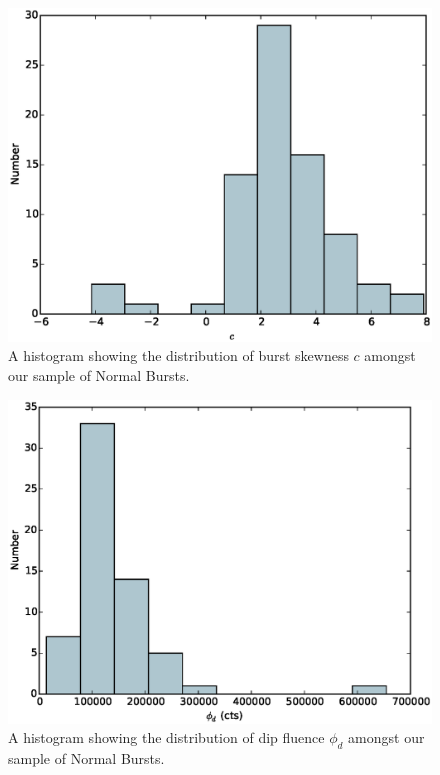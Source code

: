 \begin{figure}
  \centering
  \includegraphics[width=.9\linewidth, trim={0cm 0 0cm 0},clip]{images/appendix_burst_skew_hist.eps}
  \caption[Histogram showing the distribution of $c$ amongst Normal Bursts.]{A histogram showing the distribution of burst skewness $c$ amongst our sample of Normal Bursts. }
  \label{fig:app_hist_c}
\end{figure}

\begin{figure}
  \centering
  \includegraphics[width=.9\linewidth, trim={0cm 0 0cm 0},clip]{images/appendix_dip_aafluence_hist.eps}
  \caption[Histogram showing the distribution of $\phi_d$ amongst Normal Bursts.]{A histogram showing the distribution of dip fluence $\phi_d$ amongst our sample of Normal Bursts.}
  \label{fig:app_hist_phid}
\end{figure}


